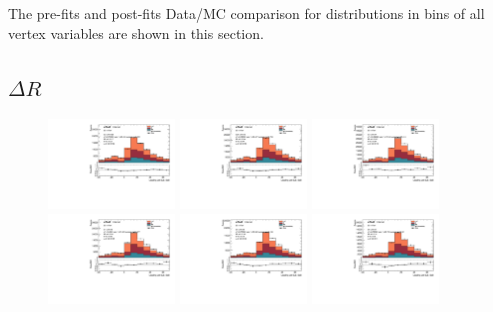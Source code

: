 The pre-fits and post-fits Data/MC comparison for \subsdzero distributions in bins of all vertex variables are shown in this section.
\label{sec:app-subsd0fits}

\subsection{$\Delta R$}

\begin{figure}[htbp]
  \centering
 \includegraphics[width=0.3\textwidth]{figures/gbb/Sub_Sd0_Fits/Canv_PreFit_02-DeltaR-025_LpT_INF_SpT_INF_coarse_x.pdf}
 \includegraphics[width=0.3\textwidth]{figures/gbb/Sub_Sd0_Fits/Canv_PreFit_025-DeltaR-03_LpT_INF_SpT_INF_coarse_x.pdf}
 \includegraphics[width=0.3\textwidth]{figures/gbb/Sub_Sd0_Fits/Canv_PreFit_03-DeltaR-04_LpT_INF_SpT_INF_coarse_x.pdf}\\
 \includegraphics[width=0.3\textwidth]{figures/gbb/Sub_Sd0_Fits/Canv_PreFit_04-DeltaR-05_LpT_INF_SpT_INF_coarse_x.pdf}
 \includegraphics[width=0.3\textwidth]{figures/gbb/Sub_Sd0_Fits/Canv_PreFit_05-DeltaR-06_LpT_INF_SpT_INF_coarse_x.pdf}
 \includegraphics[width=0.3\textwidth]{figures/gbb/Sub_Sd0_Fits/Canv_PreFit_06-DeltaR-07_LpT_INF_SpT_INF_coarse_x.pdf}\\


\end{figure}
